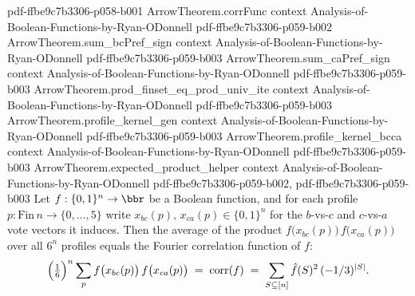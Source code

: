 \begin{lemma}
  {pdf-ffbe9c7b3306-p058-b001}
\proofstep
  {ArrowTheorem.corrFunc}
  {context}
  {Analysis-of-Boolean-Functions-by-Ryan-ODonnell}
  {pdf-ffbe9c7b3306-p059-b002}
\proofstep
  {ArrowTheorem.sum_bcPref_sign}
  {context}
  {Analysis-of-Boolean-Functions-by-Ryan-ODonnell}
  {pdf-ffbe9c7b3306-p059-b003}
\proofstep
  {ArrowTheorem.sum_caPref_sign}
  {context}
  {Analysis-of-Boolean-Functions-by-Ryan-ODonnell}
  {pdf-ffbe9c7b3306-p059-b003}
\proofstep
  {ArrowTheorem.prod_finset_eq_prod_univ_ite}
  {context}
  {Analysis-of-Boolean-Functions-by-Ryan-ODonnell}
  {pdf-ffbe9c7b3306-p059-b003}
\proofstep
  {ArrowTheorem.profile_kernel_gen}
  {context}
  {Analysis-of-Boolean-Functions-by-Ryan-ODonnell}
  {pdf-ffbe9c7b3306-p059-b003}
\proofstep
  {ArrowTheorem.profile_kernel_bcca}
  {context}
  {Analysis-of-Boolean-Functions-by-Ryan-ODonnell}
  {pdf-ffbe9c7b3306-p059-b003}
\proofstep
  {ArrowTheorem.expected_product_helper}
  {context}
  {Analysis-of-Boolean-Functions-by-Ryan-ODonnell}
  {pdf-ffbe9c7b3306-p059-b002,
    pdf-ffbe9c7b3306-p059-b003}
Let $f:\{0,1\}^n\to\bbr$ be a Boolean function, and for each profile
$p:\mathrm{Fin}\,n\to\{0,\dots,5\}$ write $x_{bc}(p),\,x_{ca}(p)\in\{0,1\}^n$ for the
$b$-vs-$c$ and $c$-vs-$a$ vote vectors it induces. Then the average of the product
$f\bigl(x_{bc}(p)\bigr)\,f\bigl(x_{ca}(p)\bigr)$ over all $6^n$ profiles equals the
Fourier correlation function of $f$:
\[
  \Bigl(\tfrac16\Bigr)^{n}\sum_{p} f\bigl(x_{bc}(p)\bigr)\,f\bigl(x_{ca}(p)\bigr)
  \;=\; \mathrm{corr}(f)
  \;=\; \sum_{S\subseteq[n]} \hat f(S)^2\,(-1/3)^{|S|}.
\]
\end{lemma}

